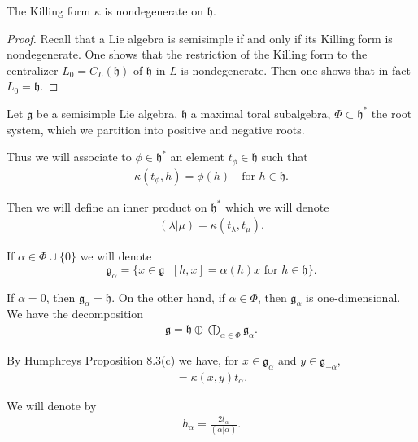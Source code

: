 \documentclass[12pt]{article}
\begin{document}
\begin{proposition}[Humphreys 8.2]
    The Killing form $\kappa$ is nondegenerate on $\mathfrak{h}$.
\end{proposition}

\begin{proof}

    Recall that a Lie algebra is semisimple if and only if its Killing form is nondegenerate. One shows that the restriction of the Killing form to the centralizer $L_0 = C_L(\mathfrak{h})$ of $\mathfrak{h}$ in $L$ is nondegenerate. Then one shows that in fact $L_0 = \mathfrak{h}$.
\end{proof}

Let $\mathfrak{g}$ be a semisimple Lie algebra, $\mathfrak{h}$ a maximal toral subalgebra, $\Phi \subset \mathfrak{h}^*$ the root system, which we partition into positive and negative roots.

Thus we will associate to $\phi \in \mathfrak{h}^*$ an element $t_\phi \in \mathfrak{h}$ such that
\begin{align*}
    \kappa(t_\phi, h) = \phi(h) \quad \text{for } h \in \mathfrak{h}.
\end{align*}

Then we will define an inner product on $\mathfrak{h}^*$ which we will denote
\begin{align*}
    (\lambda | \mu) = \kappa(t_\lambda, t_\mu).
\end{align*}

If $\alpha \in \Phi \cup \{0\}$ we will denote
\[
    \mathfrak{g}_\alpha = \{x \in \mathfrak{g} \,|\, [h,x] = \alpha(h)x \text{ for } h \in \mathfrak{h} \}.
\]

If $\alpha = 0$, then $\mathfrak{g}_\alpha = \mathfrak{h}$. On the other hand, if $\alpha \in \Phi$, then $\mathfrak{g}_\alpha$ is one-dimensional. We have the decomposition
\begin{align*}
    \mathfrak{g} = \mathfrak{h} \oplus \bigoplus_{\alpha \in \Phi} \mathfrak{g}_\alpha.
\end{align*}

By Humphreys Proposition 8.3(c) we have, for $x \in \mathfrak{g}_\alpha$ and $y \in \mathfrak{g}_{-\alpha}$,
\begin{align*}
    [x,y] = \kappa(x,y)t_\alpha.
\end{align*}

We will denote by
\begin{align*}
    h_\alpha = \frac{2t_\alpha}{(\alpha|\alpha)}.
\end{align*}
\end{document}
